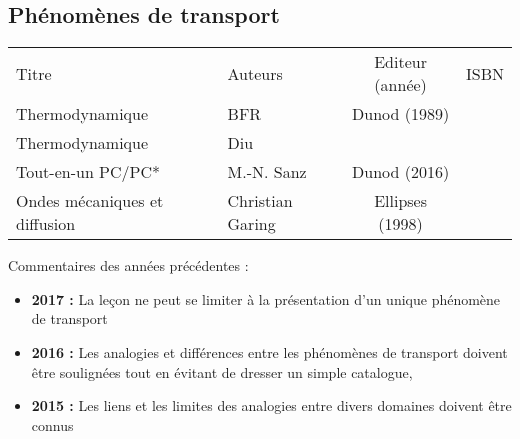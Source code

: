 \begin{headerBlock}
  \chapter{Phénomènes de transport}
    \label{LP_Transport}
\end{headerBlock}

\begin{center}
\begin{tabularx}{\textwidth}{| X | X | c | c |}
  \hline
  \rowcolor{gray!20}\multicolumn{4}{c}{Bibliographie de la leçon : } \\
  \hline 
  Titre & Auteurs & Editeur (année) & ISBN \\
  \hline
  Thermodynamique & BFR & Dunod (1989) & \\
  \hline
  Thermodynamique & Diu & & \\
  \hline 
  Tout-en-un PC/PC* & M.-N. Sanz & Dunod (2016) & \\
  \hline 
  Ondes mécaniques et diffusion & Christian Garing & Ellipses (1998) & \\
  \hline
\end{tabularx}
\end{center}

\begin{reportBlock}{Commentaires des années précédentes :}
    \begin{itemize}
        \item \textbf{2017 :} La leçon ne peut se limiter à la présentation d’un unique phénomène de transport
        \item \textbf{2016 :} Les analogies et différences entre les phénomènes de transport doivent être soulignées tout en évitant de dresser un simple catalogue,
        \item \textbf{2015 :} Les liens et les limites des analogies entre divers domaines doivent être connus
    \end{itemize}
\end{reportBlock}


